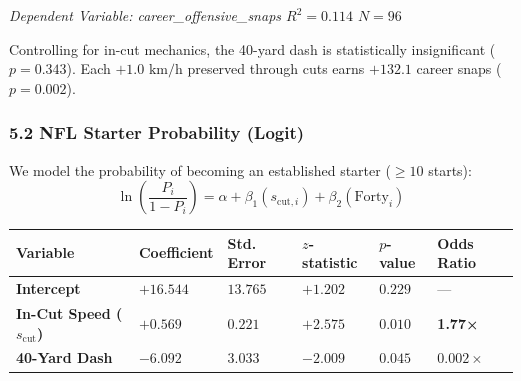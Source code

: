 \documentclass[
  letterpaper,
  DIV=11,
  numbers=noendperiod]{scrartcl}
\newcounter{none} %
\begin{document}
\emph{Dependent Variable: career\_offensive\_snaps \textbar{}
\(R^2 = 0.114\) \textbar{} \(N = 96\)}

Controlling for in-cut mechanics, the 40-yard dash is statistically
insignificant (\(p = 0.343\)). Each \(+1.0\text{ km/h}\) preserved
through cuts earns \(+132.1\) career snaps (\(p = 0.002\)).

\subsubsection{5.2 NFL Starter Probability
(Logit)}\label{nfl-starter-probability-logit}

We model the probability of becoming an established starter (\(\ge 10\)
starts):
\[\ln\left(\frac{P_i}{1 - P_i}\right) = \alpha + \beta_1 (s_{\text{cut}, i}) + \beta_2 (\text{Forty}_i)\]

{\def\LTcaptype{none} %
\begin{longtable}[]{@{}
  >{\raggedright\arraybackslash}p{}
  >{\centering\arraybackslash}p{}
  >{\centering\arraybackslash}p{}
  >{\centering\arraybackslash}p{}
  >{\centering\arraybackslash}p{}
  >{\centering\arraybackslash}p{}@{}}
\toprule\noalign{}
\begin{minipage}[b]{\linewidth}\raggedright
Variable
\end{minipage} & \begin{minipage}[b]{\linewidth}\centering
Coefficient
\end{minipage} & \begin{minipage}[b]{\linewidth}\centering
Std. Error
\end{minipage} & \begin{minipage}[b]{\linewidth}\centering
\(z\)-statistic
\end{minipage} & \begin{minipage}[b]{\linewidth}\centering
\(p\)-value
\end{minipage} & \begin{minipage}[b]{\linewidth}\centering
Odds Ratio
\end{minipage} \\
\midrule\noalign{}
\endhead
\bottomrule\noalign{}
\endlastfoot
\textbf{Intercept} & \(+16.544\) & \(13.765\) & \(+1.202\) & \(0.229\) &
--- \\
\textbf{In-Cut Speed (\(s_{\text{cut}}\))} & \(+0.569\) & \(0.221\) &
\(+2.575\) & \textbf{\(0.010\)} & \textbf{1.77×} \\
\textbf{40-Yard Dash} & \(-6.092\) & \(3.033\) & \(-2.009\) & \(0.045\)
& \(0.002×\) \\
\end{longtable}
}
\end{document}
